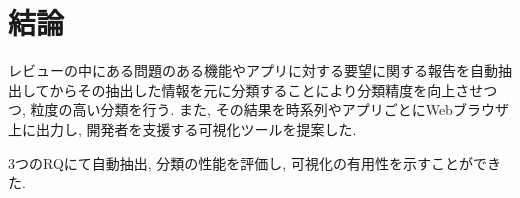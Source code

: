 \chapter{結論}
\label{chap:keturon}

レビューの中にある問題のある機能やアプリに対する要望に関する報告を自動抽出してからその抽出した情報を元に分類することにより分類精度を向上させつつ, 粒度の高い分類を行う. また, その結果を時系列やアプリごとにWebブラウザ上に出力し, 開発者を支援する可視化ツールを提案した.

3つのRQにて自動抽出, 分類の性能を評価し, 可視化の有用性を示すことができた. 